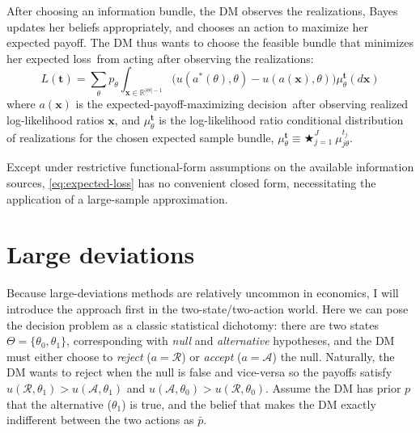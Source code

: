 \documentclass{fancyArticle}
\renewcommand{\|}{\,|\,}                    %
\providecommand{\;}{\,;}                    %
\begin{document}
After choosing an information bundle, the DM observes the realizations, Bayes updates her beliefs appropriately, and chooses an action to maximize her expected payoff.
The DM thus wants to choose the feasible bundle that minimizes her expected loss\footnotemark\ from acting after observing the realizations:
\begin{equation}\label{eq:expected-loss}
  L(\mathbf{t}) = \sum_\theta p_\theta \int_{\mathbf{x}\in \mathbb{R}^{|\Theta|-1}}
  \big(u(a^*(\theta),\theta) - u(a(\mathbf{x}),\theta)\big)
  \mu_{\theta}^{\mathbf{t}}(d\mathbf{x})
\end{equation}
where $a(\mathbf{x})$ is the expected-payoff-maximizing decision\footnotemark\ after observing realized log-likelihood ratios $\mathbf{x}$, and $\mu_{\theta}^{\mathbf{t}}$ is the log-likelihood ratio conditional distribution of realizations for the chosen expected sample bundle,  $\mu_{\theta}^{\mathbf{t}} \equiv \bigstar_{j=1}^J \ \mu_{j\theta}^{t_j}$.

Except under restrictive functional-form assumptions on the available information sources, \autoref{eq:expected-loss} has no convenient closed form, necessitating the application of a large-sample approximation.



\section{Large deviations}
\label{sec:background}

Because large-deviations methods are relatively uncommon in economics, I will introduce the approach first in the two-state/two-action world.
Here we can pose the decision problem as a classic statistical dichotomy: there are two states $\Theta = \{\theta_0,\theta_1\}$, corresponding with \textit{null} and \textit{alternative} hypotheses, and the DM must either choose to \textit{reject} ($a= \mathcal{R}$) or \textit{accept} ($a= \mathcal{A}$) the null.
Naturally, the DM wants to reject when the null is false and vice-versa so the payoffs satisfy $u(\mathcal{R},\theta_1)>u(\mathcal{A}, \theta_1)$ and $u(\mathcal{A},\theta_0)>u(\mathcal{R},\theta_{0})$.
Assume the DM has prior $p$ that the alternative ($\theta_1$) is true, and the belief that makes the DM exactly indifferent between the two actions as $\bar{p}$.
\end{document}
